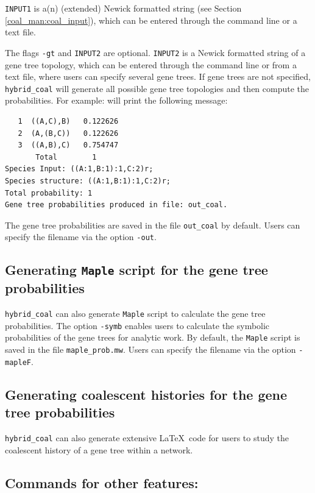 {\tt INPUT1} is a(n) (extended) Newick formatted string (see Section \ref{coal_man:coal_input}), which can be entered through the command line or a text file.

The flags {\tt -gt} and {\tt INPUT2} are optional. {\tt INPUT2} is a Newick formatted string of a gene tree topology, which can be entered through the command line or from a text file, where users can specify several gene trees. If gene trees are not specified, {\tt hybrid\_coal} will generate all possible gene tree topologies and then compute the probabilities. For example:
will print the following message:
\begin{verbatim}
   1  ((A,C),B)   0.122626
   2  (A,(B,C))   0.122626
   3  ((A,B),C)   0.754747
       Total        1
Species Input: ((A:1,B:1):1,C:2)r;
Species structure: ((A:1,B:1):1,C:2)r;
Total probability: 1
Gene tree probabilities produced in file: out_coal.
\end{verbatim}
The gene tree probabilities are saved in the file {\tt out\_coal} by default. Users can specify the filename via the option {\tt -out}.

\subsection{Generating {\tt Maple} script for the gene tree probabilities}
{\tt hybrid\_coal} can also generate {\tt Maple} script to calculate the gene tree probabilities. The option {\tt -symb} enables users to calculate the symbolic probabilities of the gene trees for analytic work. By default, the {\tt Maple} script is saved in the file {\tt maple\_prob.mw}. Users can specify the filename via the option {\tt -mapleF}.


\subsection{Generating coalescent histories for the gene tree probabilities}
{\tt hybrid\_coal} can also generate extensive \LaTeX \ code for users to study the coalescent history of a gene tree within a network.


\subsection{Commands for other features:}
